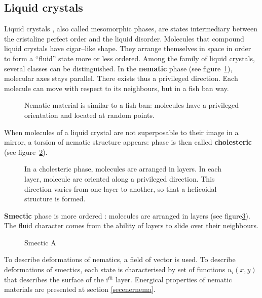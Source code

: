 \documentclass[12pt]{book}
\begin{document}
\subsection{Liquid crystals}\label{secristliquides}
Liquid crystals \cite{ph:liqcr:DeGennes74},
also called mesomorphic phases, are states
intermediary between the 
cristaline perfect order and the liquid disorder.
Molecules that compound liquid crystals have cigar--like
shape. They arrange themselves in space in order to form a ``fluid''
state more or less ordered.
Among the family of liquid crystals, several classes can be distinguished.
In the  {\bf nematic} phase (see
figure~\ref{fignematique}), molecular axes stays parallel. There exists thus a
privileged direction. Each molecule can move with respect to its
neighbours, but in a fish ban way.
\begin{figure}[htb]
 \centerline{}   
 \caption{Nematic material is similar to a fish ban: molecules have a
   privileged orientation and located at random points.}
 \label{fignematique}
\end{figure}
When molecules of a liquid crystal are not superposable to their image in a
mirror, a torsion of nematic structure appears: phase is then called 
{\bf cholesteric}  (see
figure~\ref{figcholesteric}).
\begin{figure}[htb]
 \centerline{}   
 \caption{In a cholesteric phase, molecules are arranged in layers. In each
   layer, molecule are oriented along a privileged direction. This direction
   varies from one layer to another, so that a helicoidal structure is
   formed.}
 \label{figcholesteric}
\end{figure}
{\bf Smectic} phase is more ordered :
molecules are arranged in layers (see figure\ref{figsmectiqueA}). The fluid
character comes from the ability of layers to slide over their neighbours. 
\begin{figure}[htb]
 \centerline{}   
 \caption{Smectic A}
 \label{figsmectiqueA}
\end{figure}
To describe deformations of nematics, a field of vector is used. To describe
deformations of smectics, each state is characterised by set of functions
$u_i(x,y)$ that describes the surface of the i$^{th}$ layer.
Energical properties of nematic materials are presented at section \ref{secenernema}.
\end{document}
